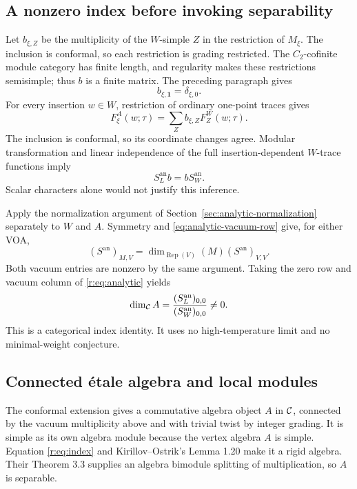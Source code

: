\documentclass[11pt,a4paper]{article}
\numberwithin{equation}{section}
\theoremstyle{definition}\newtheorem{definition}[theorem]{Definition}
\theoremstyle{remark}\newtheorem{remark}[theorem]{Remark}
\newcommand{\one}{\mathbf1}\newcommand{\B}{\mathcal B}\newcommand{\W}{W_N}
\newcommand{\Rep}{\operatorname{Rep}}\newcommand{\Ext}{\operatorname{Ext}}
\begin{document}
\subsection{A nonzero index before invoking separability}

Let \(b_{\xi,Z}\) be the multiplicity of the \(W\)-simple \(Z\) in
the restriction of \(M_\xi\). The inclusion is conformal, so each
restriction is grading restricted. The $C_2$-cofinite module category
has finite length, and regularity makes these restrictions semisimple;
thus $b$ is a finite matrix. The preceding paragraph gives
\[
                         b_{\xi,\one}=\delta_{\xi,0}.
\]
For every insertion \(w\in W\), restriction of ordinary one-point
traces gives
\[
 F^A_\xi(w;\tau)=\sum_Zb_{\xi,Z}F^W_Z(w;\tau).
\]
The inclusion is conformal, so its coordinate changes agree.
Modular transformation and linear independence of the full
insertion-dependent \(W\)-trace functions imply
\begin{equation}\label{r:eq:analytic}
                  S_L^{\mathrm{an}}b=bS_W^{\mathrm{an}}.
\end{equation}
Scalar characters alone would not justify this inference.

Apply the normalization argument of
Section~\ref{sec:analytic-normalization} separately to $W$ and $A$.
Symmetry and \eqref{eq:analytic-vacuum-row} give, for either VOA,
\[
 (S^{\mathrm{an}})_{M,V}
       =\dim_{\Rep(V)}(M)(S^{\mathrm{an}})_{V,V}.
\]
Both vacuum entries are nonzero by the same argument.
Taking the zero row and vacuum column of \eqref{r:eq:analytic} yields
\begin{equation}\label{r:eq:index}
       \dim_{\mathcal C}A
         =\frac{(S_L^{\mathrm{an}})_{0,0}}
                 {(S_W^{\mathrm{an}})_{0,0}}\ne0.
\end{equation}
This is a categorical index identity. It uses no
high-temperature limit and no minimal-weight conjecture.

\subsection{Connected \'etale algebra and local modules}

The conformal extension gives a commutative algebra object \(A\)
in \(\mathcal C\), connected by the vacuum multiplicity above and with
trivial twist by integer grading. It is simple as its own algebra
module because the vertex algebra \(A\) is simple. Equation
\eqref{r:eq:index} and Kirillov--Ostrik's Lemma 1.20 \cite{ko}
make it a rigid algebra. Their Theorem 3.3 supplies an algebra
bimodule splitting of multiplication, so \(A\) is separable.
\end{document}
